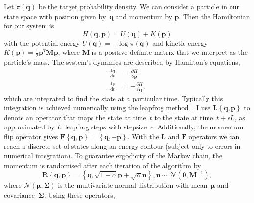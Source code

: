 \documentclass{article}
\newcommand{\dd}{\, \mathrm{d}}
\renewcommand{\vec}[1]{\ensuremath{\boldsymbol{\mathbf{#1}}}}
\newcommand{\mat}[1]{\ensuremath{\boldsymbol{\mathbf{#1}}}}
\newcommand{\op}[1]{\ensuremath{\boldsymbol{\mathbf{#1}}}}
\newcommand{\norm}[1]{\ensuremath{\mathcal{N}\left(#1\right)}}
\begin{document}
    Let $\pi\left(\vec{q}\right)$ be the target probability density.
    We can consider a particle in our state space with position given
        by~$\vec{q}$ and momentum by $\vec{p}$.
    Then the Hamiltonian for our system is
        \begin{equation}
            H\left(\vec{q},\vec{p}\right)
            = U\left(\vec{q}\right) + K\left(\vec{p}\right)
        \end{equation}
        with the potential energy
        $U\left(\vec{q}\right) = -\log{\pi\left(\vec{q}\right)}$ and kinetic
        energy $K\left(\vec{p}\right) = \frac{1}{2} \vec{p}^T \mat{M} \vec{p}$,
        where $\mat{M}$ is a positive-definite matrix that we interpret as
        the particle's mass.
    The system's dynamics are described by Hamilton's equations,
        \begin{align}
            \frac{\dd \vec{q}}{\dd t} &= \frac{\partial H}{\partial \vec{p}} \\
            \frac{\dd \vec{p}}{\dd t} &= -\frac{\partial H}{\partial \vec{q}},
        \end{align}
        which are integrated to find the state at a particular time.
    Typically this integration is achieved numerically using the leapfrog
        method~\cite{Nea11}.
    I use $\op{L}\left\{\vec{q},\vec{p}\right\}$ to denote an operator that
        maps the state at time~$t$ to the state at time~$t + \epsilon L$, as
        approximated by $L$~leapfrog steps with stepsize~$\epsilon$.
    Additionally, the momentum flip operator gives
        $\op{F}\left\{\vec{q},\vec{p}\right\}
         = \left\{\vec{q},-\vec{p}\right\}$.
    With the $\op{L}$ and $\op{F}$ operators we can reach a discrete set of
        states along an energy contour (subject only to errors in numerical
        integration).
    To guarantee ergodicity of the Markov chain, the momentum is randomised
        after each iteration of the algorithm by
        \begin{equation}
            \op{R}\left\{\vec{q},\vec{p}\right\} =
            \left\{\vec{q}, \sqrt{1-\alpha}\vec{p} + \sqrt{\alpha}\vec{n}\right\},
            \vec{n} \sim \norm{\vec{0}, \mat{M}^{-1}},
        \end{equation}
        where $\norm{\vec{\mu},\mat{\Sigma}}$ is the multivariate
        normal distribution with mean~$\vec{\mu}$ and covariance~$\mat{\Sigma}$.
    Using these operators,
\end{document}
